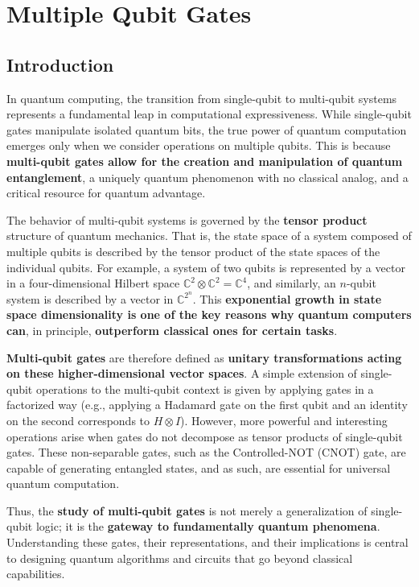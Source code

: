\section{Multiple Qubit Gates}

\subsection{Introduction}

In quantum computing, the transition from single-qubit to multi-qubit systems represents a fundamental leap in computational expressiveness. While single-qubit gates manipulate isolated quantum bits, the true power of quantum computation emerges only when we consider operations on multiple qubits. This is because \textbf{multi-qubit gates allow for the creation and manipulation of quantum entanglement}, a uniquely quantum phenomenon with no classical analog, and a critical resource for quantum advantage.

\highspace
The behavior of multi-qubit systems is governed by the \textbf{tensor product} structure of quantum mechanics. That is, the state space of a system composed of multiple qubits is described by the tensor product of the state spaces of the individual qubits. For example, a system of two qubits is represented by a vector in a four-dimensional Hilbert space $ \mathbb{C}^{2} \otimes \mathbb{C}^{2} = \mathbb{C}^{4} $, and similarly, an $n$-qubit system is described by a vector in $ \mathbb{C}^{2^{n}} $. This \textbf{exponential growth in state space dimensionality is one of the key reasons why quantum computers can}, in principle, \textbf{outperform classical ones for certain tasks}.

\highspace
\textbf{Multi-qubit gates} are therefore defined as \textbf{unitary transformations acting on these higher-dimensional vector spaces}. A simple extension of single-qubit operations to the multi-qubit context is given by applying gates in a factorized way (e.g., applying a Hadamard gate on the first qubit and an identity on the second corresponds to $ H \otimes I $). However, more powerful and interesting operations arise when gates do not decompose as tensor products of single-qubit gates. These non-separable gates, such as the Controlled-NOT (CNOT) gate, are capable of generating entangled states, and as such, are essential for universal quantum computation.

\highspace
Thus, the \textbf{study of multi-qubit gates} is not merely a generalization of single-qubit logic; it is the \textbf{gateway to fundamentally quantum phenomena}. Understanding these gates, their representations, and their implications is central to designing quantum algorithms and circuits that go beyond classical capabilities.